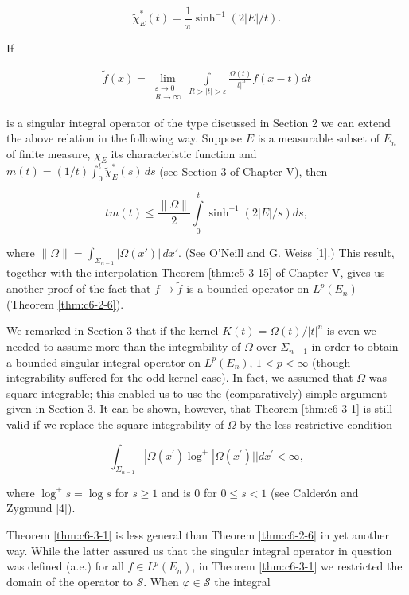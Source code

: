 \[
\tilde{\chi}_{E}^{*}(t)=\frac{1}{\pi}\sinh^{-1}(2|E|/t).
\]

If

\[
\begin{aligned}\tilde{f}(x)=\lim_{\substack{\varepsilon\to0\\ R\to\infty}}\int\limits_{R>|t|>\varepsilon}\frac{\Omega(t)}{\left|t\right|^{n}}f(x-t)dt\end{aligned}
\]

is a singular integral operator of the type discussed in Section 2 we can extend the above relation in the following way. Suppose $E$ is a measurable subset of $E_n$ of finite measure, $\chi_E$ its characteristic function and $m(t) = (1/t)\int_0^t \tilde{\chi}_E^*(s) \, ds$ (see Section 3 of Chapter V), then

\[
t m(t)\leq\frac{\|\Omega\|}{2}\int\limits_{0}^{t}\sinh^{-1}\left(2|E|/s\right)d s,
\]

where $\|\Omega\| = \int_{\Sigma_{n-1}} |\Omega(x')| \, dx'$. (See O'Neill and G. Weiss [1].) This result, together with the interpolation Theorem \ref{thm:c5-3-15} of Chapter V, gives us another proof of the fact that $f \to \tilde{f}$ is a bounded operator on $L^p(E_n)$ (Theorem \ref{thm:c6-2-6}).

 We remarked in Section 3 that if the kernel $K(t) = \Omega(t)/|t|^n$ is even we needed to assume more than the integrability of $\Omega$ over $\Sigma_{n-1}$ in order to obtain a bounded singular integral operator on $L^p(E_n)$, $1 < p < \infty$ (though integrability suffered for the odd kernel case). In fact, we assumed that $\Omega$ was square integrable; this enabled us to use the (comparatively) simple argument given in Section 3. It can be shown, however, that Theorem \ref{thm:c6-3-1} is still valid if we replace the square integrability of $\Omega$ by the less restrictive condition

\begin{equation}
\tag{*}
\int_{\Sigma_{n-1}}|\Omega(x^{\prime})\log^{+}|\Omega(x^{\prime})|\mid d x^{\prime}<\infty,
\end{equation}

where $\log^{+} s = \log s$ for $s \geq 1$ and is 0 for $0 \leq s < 1$ (see Calderón and Zygmund [4]).

 Theorem \ref{thm:c6-3-1} is less general than Theorem \ref{thm:c6-2-6} in yet another way. While the latter assured us that the singular integral operator in question was defined (a.e.) for all $f \in L^p(E_n)$, in Theorem \ref{thm:c6-3-1} we restricted the domain of the operator to $\mathcal{S}$. When $\varphi \in \mathcal{S}$ the integral

